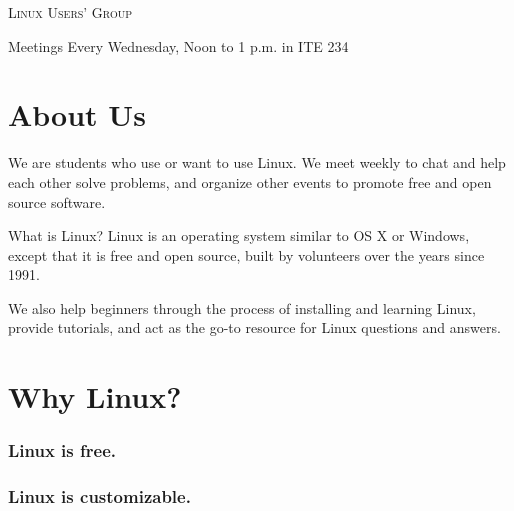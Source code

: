 \documentclass[11pt]{article}
\begin{document}
\begin{multicols*}{2}

\begin{center} \scshape \Huge
    Linux Users' Group
\end{center}

\begin{center} \Large
    Meetings
    Every Wednesday, Noon to 1 p.m. in ITE 234
\end{center}


\section*{About Us}

We are students who use or want to use Linux. We meet weekly to chat and help
each other solve problems, and organize other events to promote free and open
source software.

What is Linux? Linux is an operating system similar to OS X or Windows, except
that it is free and open source, built by volunteers over the years since 1991.

We also help beginners through the process of installing and learning Linux,
provide tutorials, and act as the go-to resource for Linux questions and
answers.

\section*{Why Linux?}

\subsubsection*{Linux is free.}


\subsubsection*{Linux is customizable.}



\end{multicols*}
\end{document}
